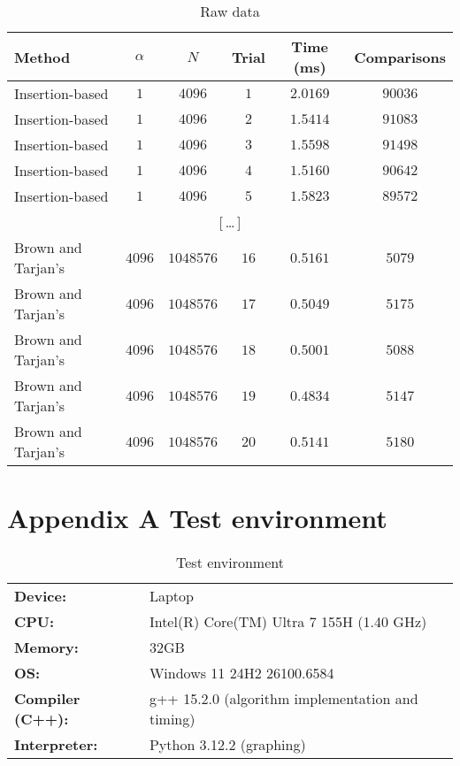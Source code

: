 \documentclass[12pt]{article}
\begin{document}
\begin{table}[h!]
\centering
\caption{Raw data}
\label{tab.raw}
\begin{tabular}{l c c c c c}
\hline
\textbf{Method} & $\alpha$ & $N$ & \textbf{Trial} & \textbf{Time (ms)} & \textbf{Comparisons} \\
\hline
Insertion-based & $1$ & $4096$ & $1$ & $2.0169$ & $90036$ \\
Insertion-based & $1$ & $4096$ & $2$ & $1.5414$ & $91083$ \\
Insertion-based & $1$ & $4096$ & $3$ & $1.5598$ & $91498$ \\
Insertion-based & $1$ & $4096$ & $4$ & $1.5160$ & $90642$ \\
Insertion-based & $1$ & $4096$ & $5$ & $1.5823$ & $89572$ \\
\multicolumn{6}{c}{[\,\dots\,]} \\
Brown and Tarjan's & $4096$ & $1048576$ & $16$ & $0.5161$ & $5079$ \\
Brown and Tarjan's & $4096$ & $1048576$ & $17$ & $0.5049$ & $5175$ \\
Brown and Tarjan's & $4096$ & $1048576$ & $18$ & $0.5001$ & $5088$ \\
Brown and Tarjan's & $4096$ & $1048576$ & $19$ & $0.4834$ & $5147$ \\
Brown and Tarjan's & $4096$ & $1048576$ & $20$ & $0.5141$ & $5180$ \\
\hline
\end{tabular}
\end{table}

\section*{Appendix A Test environment}

\begin{longtable}{@{}ll@{}}
\caption{Test environment} \label{tab.env} \\
\textbf{Device:} & Laptop \\
\textbf{CPU:} & Intel(R) Core(TM) Ultra 7 155H (1.40 GHz) \\
\textbf{Memory:} & 32GB \\
\textbf{OS:} & Windows 11 24H2 26100.6584 \\
\textbf{Compiler (C++):} & g++ 15.2.0 (algorithm implementation and timing) \\
\textbf{Interpreter:} & Python 3.12.2 (graphing) \\
\end{longtable}
\end{document}
